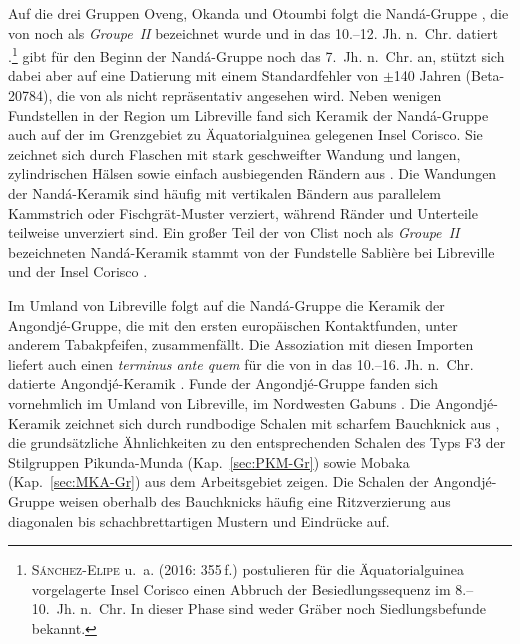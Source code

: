 Auf die drei Gruppen Oveng, Okanda und Otoumbi folgt die Nandá-Gruppe \parencite[300 Anm.~4, 338--340]{SanchezElipe.2015}, die von \textcite[628--631, 628 Abb.~7-68]{Clist.20042005} noch als \textit{Groupe~II} bezeichnet wurde und in das 10.--12. Jh. n.~Chr. datiert \parencite[357]{SanchezElipe.2016}.\footnote{\textsc{Sánchez-Elipe} u.~a. (2016: 355\,f.) postulieren für die Äquatorialguinea vorgelagerte Insel Corisco einen Abbruch der Besiedlungssequenz im 8.--10.~Jh. n.~Chr. In dieser Phase sind weder Gräber noch Siedlungsbefunde bekannt.} \textcite{Clist.20042005} gibt für den Beginn der Nandá-Gruppe noch das 7.~Jh. n.~Chr. an, stützt sich dabei aber auf eine Datierung mit einem Standardfehler von $\pm$140 Jahren (Beta-20784), die von \textcites[357]{SanchezElipe.2016} als nicht repräsentativ angesehen wird. Neben wenigen Fundstellen in der Region um Libreville \parencite[629 Abb.~7-69]{Clist.20042005} fand sich Keramik der Nandá-Gruppe auch auf der im Grenzgebiet zu Äquatorialguinea gelegenen Insel Corisco. Sie zeichnet sich durch Flaschen mit stark geschweifter Wandung und langen, zylindrischen Hälsen sowie einfach ausbiegenden Rändern aus \parencites[Abb.~\ref{fig:Gabon_Sequence}.10--11; ebd. 603--611 Abb.~7-47--7-55;][222 Abb.~6.41, 303--315 Abb.~7.46--7.58]{SanchezElipe.2015}[137 Abb.~18]{GonzalesRuibal.2012}. Die Wandungen der Nandá-Keramik sind häufig mit vertikalen Bändern aus parallelem Kammstrich oder Fischgrät-Muster verziert, während Ränder und Unterteile teilweise unverziert sind. Ein großer Teil der von Clist noch als \textit{Groupe~II} bezeichneten Nandá-Keramik stammt von der Fundstelle Sablière bei Libreville \parencite[600--614]{Clist.20042005} und der Insel Corisco \parencites{GonzalezRuibal.2011}{GonzalesRuibal.2012}.

Im Umland von Libreville folgt auf die Nandá-Gruppe die Keramik der Angondjé-Gruppe, die mit den ersten europäischen Kontaktfunden, unter anderem Tabakpfeifen, zusammenfällt. Die Assoziation mit diesen Importen liefert auch einen \textit{terminus ante quem} für die von \textcite[691]{Clist.20042005} in das 10.--16. Jh. n.~Chr. datierte Angondjé-Keramik \parencites[siehe][224]{SanchezElipe.2015}[357\,f.]{SanchezElipe.2016}. Funde der Angondjé-Gruppe fanden sich vornehmlich im Umland von Libreville, im Nordwesten Gabuns \parencite[692 Abb.~7-122]{Clist.20042005}. Die Angondjé-Keramik zeichnet sich durch rundbodige Schalen mit scharfem Bauchknick aus \parencite[Abb.~\ref{fig:Gabon_Sequence}.12--13; ebd. 645--649 Abb.~7.81--7.85; ][187 Abb.~6.20, 223--224 Abb.~6.42--6.43]{SanchezElipe.2015}, die grundsätzliche Ähnlichkeiten zu den entsprechenden Schalen des Typs F3 der Stilgruppen Pikunda-Munda (Kap.~\ref{sec:PKM-Gr}) sowie Mobaka (Kap.~\ref{sec:MKA-Gr}) aus dem Arbeitsgebiet zeigen. Die Schalen der Angondjé-Gruppe weisen oberhalb des Bauchknicks häufig eine Ritzverzierung aus diagonalen bis schachbrettartigen Mustern und Eindrücke auf.\vfill 
